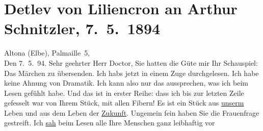 

         
         \renewcommand{\erwaehntePersonen}{Personen: Detlev von Liliencron}
         \renewcommand{\erwaehnteOrte}{Orte: Hamburg, Palmaille, Wien}
         \renewcommand{\erwaehnteWerke}{Werke: Das Märchen. Schauspiel in drei Aufzügen}
               \section[Detlev von Liliencron an Arthur Schnitzler, 7. 5. 1894]{ Detlev von Liliencron an Arthur Schnitzler, 7. 5. 1894}\nopagebreak{}\rehead{ }\begin{ledgroupsized}[t]{13cm}\normalsize\beginnumbering \toendnotes[C]{\smallbreak\pagebreak[2]} 
\toendnotes[C]{\smallbreak}\pstart
           \raggedleft{}{\pb}Altona (Elbe), Palmaille 5,{\\}Den
                     7. 5. 94.\pend
           \pstart{}Sehr geehrter Herr Doctor,\pend\pstart
           Sie hatten die Güte mir Ihr Schauspiel: Das
                  Märchen zu übersenden.\pend
           \pstart
           Ich habs jetzt in einem Zuge durchgelesen. Ich habe keine Ahnung von Dramatik. Ich
               kann also nur das aussprechen, was ich beim Lesen gefühlt habe. Und das ist in erster
               Reihe: dass ich bis zur letzten Zeile gefesselt war von Ihrem Stück, mit allen Fibern! Es ist ein Stück aus \uline{unserm} Leben und aus dem Leben der \uline{Zukunft}. Ungemein fein haben Sie die Frauenfrage gestreift. Ich \uline{sah} beim Lesen alle Ihre Menschen ganz leibhaftig vor

\end{ledgroupsized}
